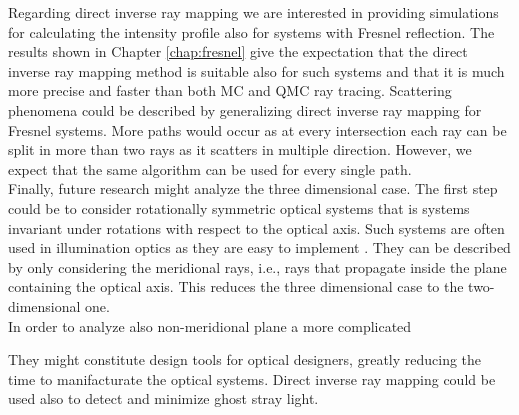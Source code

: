 Regarding direct inverse ray mapping we are interested in providing simulations for calculating the intensity profile also for systems with Fresnel reflection. The results shown in Chapter \ref{chap:fresnel} give the expectation that the direct inverse ray mapping method is suitable also for such systems and that it is much more precise and faster than both MC and QMC ray tracing. Scattering phenomena could be described by generalizing direct inverse ray mapping for Fresnel systems. More paths would occur as at every intersection each ray can be split in more than two rays as it scatters in multiple direction. However, we expect that the same algorithm can be used for every single path.
 \\ \indent 
Finally, future research might analyze the three dimensional case. The first step could be to consider rotationally symmetric optical systems that is systems invariant under rotations with respect to the optical axis. Such systems are often used in illumination optics as they are easy to implement \cite{ries1997performance}. They can be described by only considering the meridional rays, i.e., rays that propagate inside the plane containing the optical axis. This reduces the three dimensional case to the two-dimensional one. \\ \indent In order to analyze also non-meridional plane a more complicated 

They might constitute design tools for optical designers, greatly reducing the time to manifacturate the optical systems. Direct inverse ray mapping could be used also to detect and minimize ghost stray light.
